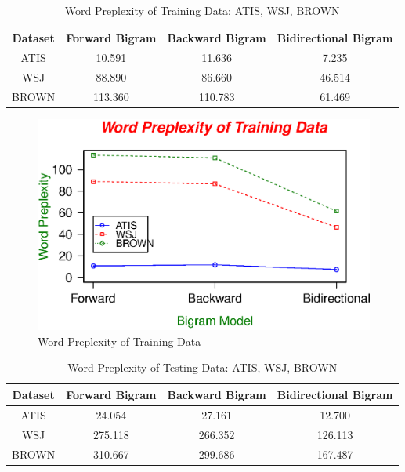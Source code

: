 \documentclass[journal, a4paper]{IEEEtran}
\begin{document}
	\begin{table}[!hbt]
		\begin{center}
		\caption{Word Preplexity of Training Data: ATIS, WSJ, BROWN}
		\label{comp:1}
		\begin{tabular}{|c|c|c|c|}
			\hline
			Dataset & Forward Bigram & Backward Bigram & Bidirectional Bigram\\
			\hline
			 ATIS & 10.591  & 11.636 & 7.235 \\ \hline
			 WSJ &  88.890 &  86.660 & 46.514 \\ \hline
			BROWN & 113.360 & 110.783 & 61.469 \\
			\hline
		\end{tabular}
		\end{center}
	\end{table}
	
		\begin{figure}[!hbt]
		\begin{center}
		\includegraphics[width=\columnwidth]{WofTrain}
		\caption{Word Preplexity of Training Data}
		\label{fig:tf_plot1}
		\end{center}
	\end{figure}

	\begin{table}[!hbt]
		\begin{center}
		\caption{Word Preplexity of Testing Data: ATIS, WSJ, BROWN}
		\label{comp:2}
		\begin{tabular}{|c|c|c|c|}
			\hline
			Dataset & Forward Bigram & Backward Bigram & Bidirectional Bigram\\
			\hline
			 ATIS & 24.054  & 27.161 & 12.700 \\ \hline
			 WSJ &  275.118 &  266.352 & 126.113 \\ \hline
			BROWN & 310.667 & 299.686 & 167.487 \\
			\hline
		\end{tabular}
		\end{center}
	\end{table}
\end{document}
